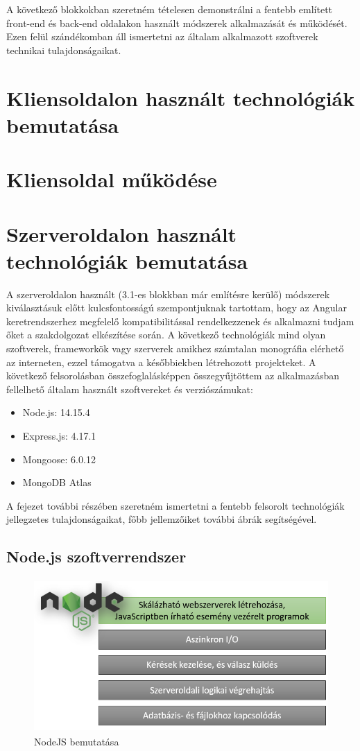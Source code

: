\bigskip
A következő blokkokban szeretném tételesen demonstrálni a fentebb említett front-end és back-end oldalakon használt módszerek alkalmazását és működését. Ezen felül szándékomban áll ismertetni az általam alkalmazott szoftverek technikai tulajdonságaikat.
\section{Kliensoldalon használt technológiák bemutatása}

\section{Kliensoldal működése}

\section{Szerveroldalon használt technológiák bemutatása}
A szerveroldalon használt (3.1-es blokkban már említésre kerülő) módszerek kiválasztásuk előtt kulcsfontosságú szempontjuknak tartottam, hogy az Angular keretrendszerhez megfelelő kompatibilitással rendelkezzenek és alkalmazni tudjam őket a szakdolgozat elkészítése során. A következő technológiák mind olyan szoftverek, frameworkök vagy szerverek amikhez számtalan monográfia elérhető az interneten, ezzel támogatva a későbbiekben létrehozott projekteket. A következő felsorolásban összefoglalásképpen összegyűjtöttem az alkalmazásban fellelhető általam használt szoftvereket és verziószámukat:

\begin{itemize}
	\item Node.js: 14.15.4
	\item Express.js: 4.17.1
	\item Mongoose: 6.0.12
	\item MongoDB Atlas
\end{itemize}

\bigskip
A fejezet további részében szeretném ismertetni a fentebb felsorolt technológiák jellegzetes tulajdonságaikat, főbb jellemzőiket további ábrák segítségével.

\subsection{Node.js szoftverrendszer}

\begin{figure}[H]
	\centering
	\includegraphics[width=1.0\textwidth,height=220px]{images/nodejs_bemutatasa.png}
	\caption{NodeJS bemutatása}
	\label{fig.picture-3}
\end{figure}


